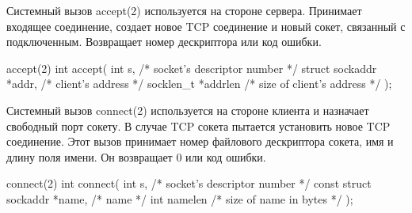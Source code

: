 Системный вызов accept(2) используется на стороне сервера. Принимает входящее соединение, создает новое TCP соединение и новый сокет, связанный с подключенным. Возвращает номер дескриптора или код ошибки.

\begin{CCode}{accept(2)}
	int accept( 
		int s, 					/* socket's descriptor number */ 
		struct sockaddr *addr,	/* client's address */ 
		socklen_t *addrlen 		/* size of client's address */ 
	); \end{CCode} 


Системный вызов connect(2) используется на стороне клиента и назначает свободный порт сокету. В случае TCP сокета пытается установить новое TCP соединение. Этот вызов принимает номер файлового дескриптора сокета, имя и длину поля имени. Он возвращает 0 или код ошибки.

\begin{CCode}{connect(2)}
	int connect( 
		int s,							/* socket's descriptor number */ 
		const struct sockaddr *name, 	/* name */ 
		int namelen 					/* size of name in bytes */ 
	); \end{CCode} 
